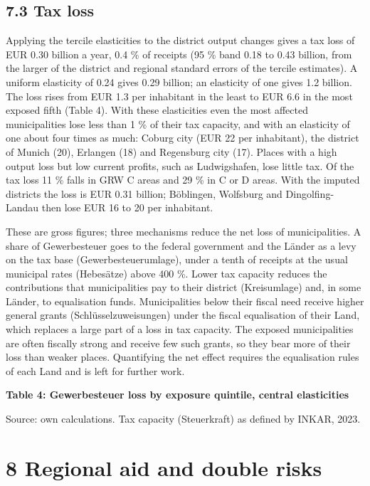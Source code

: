 \documentclass[
  11pt,
]{article}
\begin{document}
\hypertarget{tax-loss}{%
\subsection{7.3 Tax loss}\label{tax-loss}}

Applying the tercile elasticities to the district output changes gives a
tax loss of EUR 0.30 billion a year, 0.4 \% of receipts (95 \% band 0.18
to 0.43 billion, from the larger of the district and regional standard
errors of the tercile estimates). A uniform elasticity of 0.24 gives
0.29 billion; an elasticity of one gives 1.2 billion. The loss rises
from EUR 1.3 per inhabitant in the least to EUR 6.6 in the most exposed
fifth (Table 4). With these elasticities even the most affected
municipalities lose less than 1 \% of their tax capacity, and with an
elasticity of one about four times as much: Coburg city (EUR 22 per
inhabitant), the district of Munich (20), Erlangen (18) and Regensburg
city (17). Places with a high output loss but low current profits, such
as Ludwigshafen, lose little tax. Of the tax loss 11 \% falls in GRW C
areas and 29 \% in C or D areas. With the imputed districts the loss is
EUR 0.31 billion; Böblingen, Wolfsburg and Dingolfing-Landau then lose
EUR 16 to 20 per inhabitant.

These are gross figures; three mechanisms reduce the net loss of
municipalities. A share of Gewerbesteuer goes to the federal government
and the Länder as a levy on the tax base (Gewerbesteuerumlage), under a
tenth of receipts at the usual municipal rates (Hebesätze) above 400 \%.
Lower tax capacity reduces the contributions that municipalities pay to
their district (Kreisumlage) and, in some Länder, to equalisation funds.
Municipalities below their fiscal need receive higher general grants
(Schlüsselzuweisungen) under the fiscal equalisation of their Land,
which replaces a large part of a loss in tax capacity. The exposed
municipalities are often fiscally strong and receive few such grants, so
they bear more of their loss than weaker places. Quantifying the net
effect requires the equalisation rules of each Land and is left for
further work.

\textbf{Table 4: Gewerbesteuer loss by exposure quintile, central
elasticities}



Source: own calculations. Tax capacity (Steuerkraft) as defined by
INKAR, 2023.

\hypertarget{regional-aid-and-double-risks}{%
\section{8 Regional aid and double
risks}\label{regional-aid-and-double-risks}}
\end{document}

